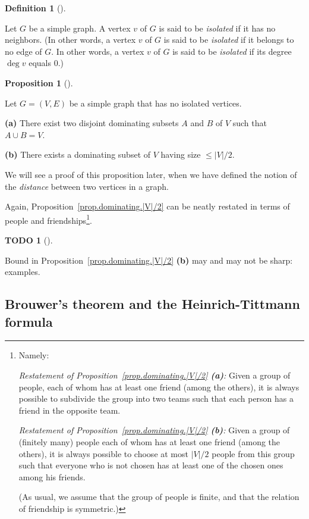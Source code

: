 \documentclass[numbers=enddot,12pt,final,onecolumn,notitlepage]{scrartcl}%
\theoremstyle{definition}
\newtheorem{prop}[theo]{Proposition}
\newenvironment{proposition}[1][]
{\begin{prop}[#1]\begin{leftbar}}
{\end{leftbar}\end{prop}}
\newtheorem{defi}[theo]{Definition}
\newenvironment{definition}[1][]
{\begin{defi}[#1]\begin{leftbar}}
{\end{leftbar}\end{defi}}
\newtheorem{quest}[theo]{TODO}
\newenvironment{todo}[1][]
{\begin{quest}[#1]\begin{leftbar}}
{\end{leftbar}\end{quest}}
\newcommand{\abs}[1]{\left| #1 \right|}
\newcommand{\tup}[1]{\left( #1 \right)}
\begin{document}
\begin{definition} \label{def.intro.isolated}
Let $G$ be a simple graph. A vertex $v$ of $G$ is said to be
\textit{isolated} if it has no neighbors. (In other words, a vertex
$v$ of $G$ is said to be \textit{isolated} if it belongs to no edge
of $G$. In other words, a vertex
$v$ of $G$ is said to be \textit{isolated} if its degree $\deg v$
equals $0$.)
\end{definition}

\begin{proposition} \label{prop.dominating.|V|/2}
Let $G = \tup{V, E}$ be a simple graph that has no isolated vertices.

\textbf{(a)} There exist two disjoint dominating subsets $A$ and $B$
of $V$ such that $A \cup B = V$.

\textbf{(b)} There exists a dominating subset of $V$ having size
$\leq \abs{V}/2$.
\end{proposition}

We will see a proof of this proposition later, when we have defined
the notion of the \textit{distance} between two vertices in a graph.

Again, Proposition~\ref{prop.dominating.|V|/2} can be neatly restated
in terms of people and friendships\footnote{Namely:

\textit{Restatement of
Proposition~\ref{prop.dominating.|V|/2} \textbf{(a)}:} Given a group
of people, each of whom has at least one friend (among the others),
it is always possible to subdivide the group into two teams such that
each person has a friend in the opposite team.

\textit{Restatement of
Proposition~\ref{prop.dominating.|V|/2} \textbf{(b)}:} Given a group
of (finitely many) people each of whom has at least one friend (among
the others),
it is always possible to choose at most $\abs{V}/{2}$ people from this
group such that everyone who is not chosen has at least one of the
chosen ones among his friends.

(As usual, we assume that the group of people is finite, and that the
relation of friendship is symmetric.)}.

\begin{todo}
Bound in Proposition~\ref{prop.dominating.|V|/2} \textbf{(b)}
may and may not be sharp: examples.
\end{todo}

\subsection{\label{subsect.dominating.odd}Brouwer's theorem and the
Heinrich-Tittmann formula}
\end{document}
